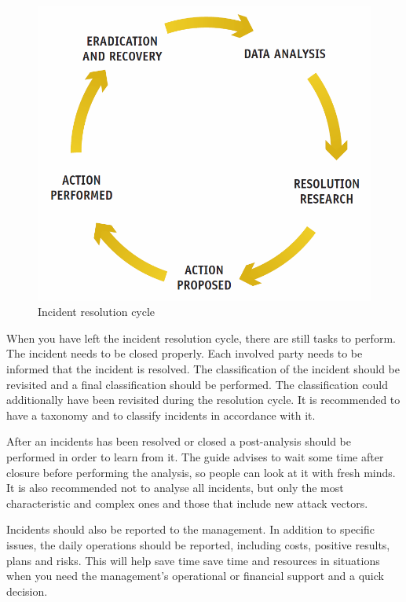 \begin{figure}[h]
\begin{center}
\includegraphics[scale=0.4]{IncidentResolutionCycle.png}
\caption[Incident resolution cycle]{Incident resolution cycle \cite{enisaGuide}}
\label{fig:IncidentResolutionCycle}
\end{center}
\end{figure}

When you have left the incident resolution cycle, there are still tasks to perform. The incident needs to be closed properly. Each involved party needs to be informed that the incident is resolved. The classification of the incident should be revisited and a final classification should be performed. The classification could additionally have been revisited during the resolution cycle. It is recommended to have a taxonomy and to classify incidents in accordance with it.

After an incidents has been resolved or closed a post-analysis should be performed in order to learn from it. The guide advises to wait some time after closure before performing the analysis, so people can look at it with fresh minds. It is also recommended not to analyse all incidents, but only the most characteristic and complex ones and those that include new attack vectors. 

Incidents should also be reported to the management. In addition to specific issues, the daily operations should be reported, including costs, positive results, plans and risks. This will help save time save time and resources in situations when you need the management's operational or financial support and a quick decision.



